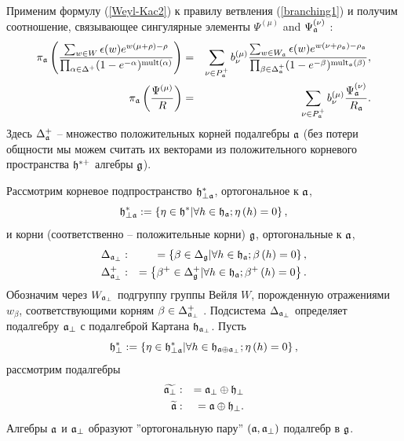 Применим формулу  (\ref{Weyl-Kac2}) к правилу ветвления (\ref{branching1}) и получим соотношение, связывающее сингулярные элементы
 $\Psi ^{\left( \mu \right) }$ and $\Psi _{ \mathfrak{a}}^{\left( \nu \right) }$ :
\begin{eqnarray}
\nonumber
\pi _{\af}\left( \frac{\sum_{w \in W}\epsilon (w )e^{w
(\mu +\rho )-\rho }}{\prod_{\alpha \in \Delta ^{+}}(1-e^{-\alpha })^{\mathrm{%
mult}(\alpha )}}\right) &=&\sum_{\nu \in P_{\af}^{+}}b_{\nu }^{(\mu )}%
\frac{\sum_{w \in W_{\af}}\epsilon (w )e^{w (\nu +\rho _{%
\af})-\rho _{\af}}}{\prod_{\beta \in \Delta _{\af%
}^{+}}(1-e^{-\beta })^{\mathrm{mult}_{\af}(\beta )}},  \label{eq:124} \\
\pi _{\af}\left( \frac{\Psi ^{\left( \mu \right) }}{R}\right)
&=&\sum_{\nu \in P_{\af}^{+}}b_{\nu }^{(\mu )}\frac{\Psi _{ \frak{%
a}}^{\left( \nu \right) }}{R_{\af}}.
\end{eqnarray}
Здесь $\Delta _{\mathfrak{a}}^{+}$ -- множество положительных корней подалгебры $\mathfrak{a}$ (без потери общности мы можем считать их векторами из положительного корневого пространства  $\mathfrak{h}^{\ast  +}$ алгебры $\mathfrak{g}$).

Рассмотрим корневое подпространство $\mathfrak{h}_{\perp \mathfrak{a}}^{\ast }$, ортогональное к  $\mathfrak{a}$,
\begin{equation*}
\mathfrak{h}_{\perp \mathfrak{a}}^{\ast }:=\left\{ \eta \in \mathfrak{h}^{\ast }
|\forall h \in \mathfrak{h}_{\mathfrak{a}};  \eta\left(h \right)=0 \right\} ,
\end{equation*}
и корни (соответственно -- положительные корни)  $\mathfrak{g}$, ортогональные
к $\mathfrak{a}$,
\begin{eqnarray}
\label{delta-a-ort}
\Delta _{\af_{\perp }} &:&=\left\{ \beta \in \Delta _{\gf}|
\forall h \in \hf_{\af};  \beta\left(h \right)=0  \right\} , \\
\Delta _{\af_{\perp }}^{+} &:&=\left\{ \beta ^{+}\in \Delta _{\gf%
}^{+}|\forall h \in \hf_{\af};  \beta^{+}\left(h \right)=0  \right\} .
\end{eqnarray}
Обозначим через $W_{\mathfrak{a}_{\perp}}$ подгруппу группы Вейля $W$, порожденную отражениями $w _{\beta }$, соответствующими корням $\beta \in \Delta _{\mathfrak{a}_{\perp}}^{+}$ . Подсистема  $\Delta _{\mathfrak{a}_{\perp }}$ определяет подалгебру $\mathfrak{a}_{\perp }$ с подалгеброй Картана $\mathfrak{h}_{\mathfrak{a}_{\perp}}$. Пусть
\begin{equation*}
\mathfrak{h}_{\perp }^{\ast }:=\left\{ \eta \in \mathfrak{h}_{\perp \mathfrak{a}}^{\ast
}|\forall h \in \mathfrak{h}_{\mathfrak{a}\oplus \mathfrak{a}_{\perp}}; \eta \left( h \right)=0 \right\},
\end{equation*}
рассмотрим подалгебры
\begin{eqnarray*}
\widetilde{\mathfrak{a}_{\perp }} &:&=\mathfrak{a}_{\perp }\oplus \mathfrak{h}_{\perp }
\\
\widetilde{\mathfrak{a}} &:&=\mathfrak{a}\oplus \mathfrak{h}_{\perp }.
\end{eqnarray*}
Алгебры $\mathfrak{a}$ и $\mathfrak{a}_{\perp }$ образуют ''ортогональную пару''
$\left( \mathfrak{a},\mathfrak{a}_{\perp}\right)$ подалгебр в  $\mathfrak{g}$.

